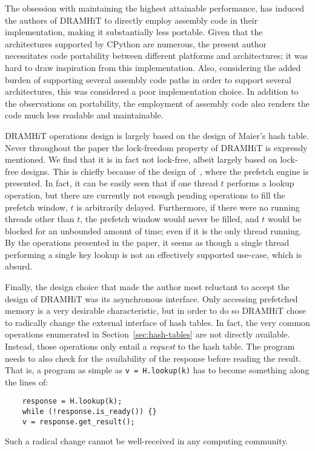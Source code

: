 The obsession with maintaining the highest attainable performance, has induced the authors of DRAMHiT to directly employ assembly code in their implementation, making it substantially less portable.
Given that the architectures supported by CPython are numerous, the present author necessitates code portability between different platforms and architectures; it was hard to draw inspiration from this implementation.
Also, considering the added burden of supporting several assembly code paths in order to support several architectures, this was considered a poor implementation choice.
In addition to the observations on portability, the employment of assembly code also renders the code much less readable and maintainable.

DRAMHiT operations design is largely based on the design of Maier's hash table.
Never throughout the paper the lock-freedom property of DRAMHiT is expressly mentioned.
We find that it is in fact not lock-free, albeit largely based on lock-free designs.
This is chiefly because of the design of~\cite[Algorithm~1]{dramhit}, where the prefetch engine is presented.
In fact, it can be easily seen that if one thread $t$ performs a lookup operation, but there are currently not enough pending operations to fill the prefetch window, $t$ is arbitrarily delayed.
Furthermore, if there were no running threads other than $t$, the prefetch window would never be filled, and $t$ would be blocked for an unbounded amount of time; even if it is the only thread running.
By the operations presented in the paper, it seems as though a single thread performing a single key lookup is not an effectively supported use-case, which is absurd.

Finally, the design choice that made the author most reluctant to accept the design of DRAMHiT was its asynchronous interface.
Only accessing prefetched memory is a very desirable characteristic, but in order to do so DRAMHiT chose to radically change the external interface of hash tables.
In fact, the very common operations enumerated in Section~\ref{sec:hash-tables} are not directly available.
Instead, those operations only entail a \emph{request} to the hash table.
The program needs to also check for the availability of the response before reading the result.
That is, a program as simple as \texttt{{v = H.lookup(k)}} has to become something along the lines of:
\begin{verbatim}
	response = H.lookup(k);
	while (!response.is_ready()) {}
	v = response.get_result();
\end{verbatim}
Such a radical change cannot be well-received in any computing community.

